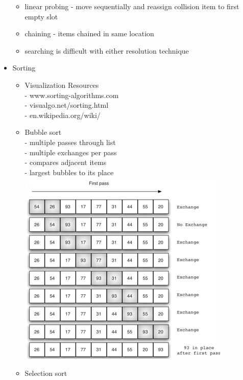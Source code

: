 \documentclass{article}
\begin{document}
\begin{multicols*}{3}
\begin{itemize}[noitemsep]
\begin{itemize}
            \item linear probing - move sequentially and 
            reassign collision item to first empty slot
            \item chaining - items chained in same location
            \item searching is difficult with either
            resolution technique
        \end{itemize}
    \item Sorting
        \begin{itemize}
            \item Visualization Resources \\
            - www.sorting-algorithms.com \\
            - visualgo.net/sorting.html \\
            - en.wikipedia.org/wiki/
            \item Bubble sort \\
            - multiple passes through list \\
            - multiple exchanges per pass \\
            - compares adjacent items \\
            - largest bubbles to its place
            \includegraphics[width=\linewidth]{bubble_sort}
            \item Selection sort \\

\end{itemize}
\end{itemize}
\end{multicols*}
\end{document}

